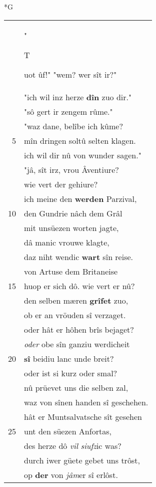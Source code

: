 \documentclass[8pt,a4paper,notitlepage]{article}
\begin{document}
\newpage
\begin{table}[ht]
\begin{minipage}[t]{0.5\linewidth}
\small
\begin{center}*G
\end{center}
\begin{tabular}{rl}
 & "\begin{large}T\end{large}uot ûf!" "wem? wer sît ir?"\\ 
 & "ich wil inz herze \textbf{dîn} zuo dir."\\ 
 & "sô gert ir zengem rûme."\\ 
 & "waz dane, belîbe ich kûme?\\ 
5 & mîn dringen soltû selten klagen.\\ 
 & ich wil dir nû von wunder sagen."\\ 
 & "jâ, sît irz, vrou Âventiure?\\ 
 & wie vert der gehiure?\\ 
 & ich meine den \textbf{werden} Parzival,\\ 
10 & den Gundrie nâch dem Grâl\\ 
 & mit unsüezen worten jagte,\\ 
 & dâ manic vrouwe klagte,\\ 
 & daz niht wendic \textbf{wart} sîn reise.\\ 
 & von Artuse dem Britaneise\\ 
15 & huop er sich dô. wie vert er nû?\\ 
 & den selben mæren \textbf{grîfet} zuo,\\ 
 & ob er an vröuden sî verzaget.\\ 
 & oder hât er hôhen brîs bejaget?\\ 
 & \textit{oder} obe sîn ganziu werdicheit\\ 
20 & \textbf{sî} beidiu lanc unde breit?\\ 
 & oder ist si kurz oder smal?\\ 
 & nû prüevet uns die selben zal,\\ 
 & waz von sînen handen sî geschehen.\\ 
 & hât er Muntsalvatsche sît gesehen\\ 
25 & unt den süezen Anfortas,\\ 
 & des herze dô \textit{vil} \textit{siufz}ic was?\\ 
 & durch iwer güete gebet uns trôst,\\ 
 & op \textbf{der} von \textit{jâm}er sî erlôst.\\ 

\end{tabular}
\end{minipage}
\end{table}
\end{document}
